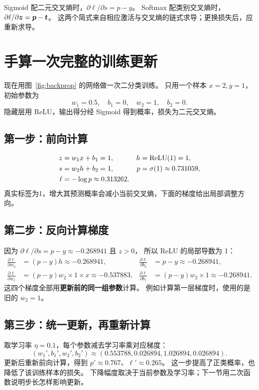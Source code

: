 \begin{keyidea}[两个常见输出梯度]
Sigmoid 配二元交叉熵时，$\partial\ell/\partial s=p-y$。
Softmax 配类别交叉熵时，$\partial\ell/\partial\boldsymbol{z}=\boldsymbol{p}-\boldsymbol{t}$。
这两个简式来自相应激活与交叉熵的链式求导；更换损失后，应重新求导。
\end{keyidea}

\section{手算一次完整的训练更新}
\label{sec:nn-example}

现在用图~\ref{fig:backprop} 的网络做一次二分类训练。
只用一个样本 $x=2,y=1$，初始参数为
\[
 w_1=0.5,\quad b_1=0,\quad w_2=1,\quad b_2=0.
\]
隐藏层用 ReLU，输出得分经 Sigmoid 得到概率，损失为二元交叉熵。

\subsection{第一步：前向计算}
\begin{align*}
 z&=w_1x+b_1=1, & h&=\operatorname{ReLU}(1)=1,\\
 s&=w_2h+b_2=1, & p&=\sigma(1)\approx0.731059,\\
 \ell&=-\log p\approx0.313262.
\end{align*}
真实标签为1，增大其预测概率会减小当前交叉熵，下面的梯度给出局部调整方向。

\subsection{第二步：反向计算梯度}
因为 $\partial\ell/\partial s=p-y\approx-0.268941$ 且 $z>0$，
所以 ReLU 的局部导数为 1：
\begin{align*}
 \frac{\partial\ell}{\partial w_2}&=(p-y)h\approx-0.268941,
 &\frac{\partial\ell}{\partial b_2}&=p-y\approx-0.268941,\\
 \frac{\partial\ell}{\partial w_1}&=(p-y)w_2\times1\times x\approx-0.537883,
 &\frac{\partial\ell}{\partial b_1}&=(p-y)w_2\times1\approx-0.268941.
\end{align*}
这四个梯度全部用\textbf{更新前的同一组参数}计算。
例如计算第一层梯度时，使用的是旧的 $w_2=1$。

\subsection{第三步：统一更新，再重新计算}
取学习率 $\eta=0.1$，每个参数减去学习率乘对应梯度：
\[
 (w_1',b_1',w_2',b_2')
 \approx(0.553788,0.026894,1.026894,0.026894).
\]
更新后重新前向计算，得到 $p'\approx0.767$、$\ell'\approx0.265$。
这一步提高了正类概率，也降低了该训练样本的损失。
下降幅度取决于当前参数及学习率；下一节用二次函数说明步长怎样影响更新。

